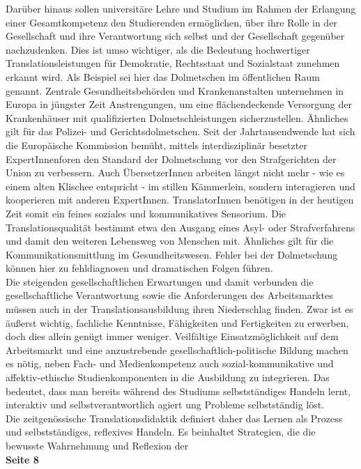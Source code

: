 \documentclass{article}
\begin{document}
	Darüber hinaus sollen universitäre Lehre und Studium im Rahmen der Erlangung einer Gesamtkompetenz den Studierenden ermöglichen, über ihre Rolle in der Gesellschaft und ihre Verantwortung sich selbst und der Gesellschaft gegenüber nachzudenken. Dies ist umso wichtiger, als die Bedeutung hochwertiger Translationsleistungen für Demokratie, Rechtsstaat und Sozialstaat zunehmen erkannt wird. Als Beispiel sei hier das Dolmetschen im öffentlichen Raum genannt. Zentrale Gesundheitsbehörden und Krankenanstalten unternehmen in Europa in jüngster Zeit Anstrengungen, um eine flächendeckende Versorgung der Krankenhäuser mit qualifizierten Dolmetschleistungen sicherzustellen. Ähnliches gilt für das Polizei- und Gerichtsdolmetschen. Seit der Jahrtausendwende hat sich die Europäische Kommission bemüht, mittels interdisziplinär besetzter ExpertInnenforen den Standard der Dolmetschung vor den Strafgerichten der Union zu verbessern. Auch ÜbersetzerInnen arbeiten längst nicht mehr - wie es einem alten Klischee entspricht - im stillen Kämmerlein, sondern interagieren und kooperieren mit anderen ExpertInnen. TranslatorInnen benötigen in der heutigen Zeit somit ein feines soziales und kommunikatives Sensorium. Die Translationsqualität bestimmt etwa den Ausgang eines Asyl- oder Strafverfahrens und damit den weiteren Lebensweg von Menschen mit. Ähnliches gilt für die Kommunikationsmittlung im Gesundheitswesen. Fehler bei der Dolmetschung können hier zu fehldiagnosen und dramatischen Folgen führen. \\
	Die steigenden gesellschaftlichen Erwartungen und damit verbunden die gesellschaftliche Verantwortung sowie die Anforderungen des Arbeitsmarktes müssen auch in der Translationsausbildung ihren Niederschlag finden. Zwar ist es äußerst wichtig, fachliche Kenntnisse, Fähigkeiten und Fertigkeiten zu erwerben, doch dies allein genügt immer weniger. Veilfältige Einsatzmöglichkeit auf dem Arbeitsmarkt und eine anzustrebende gesellschaftlich-politische Bildung machen es nötig, neben Fach- und Medienkompetenz auch sozial-kommunikative und affektiv-ethische Studienkomponenten in die Ausbildung zu integrieren. Das bedeutet, dass man bereits während des Studiums selbstständiges Handeln lernt, interaktiv und selbstverantwortlich agiert ung Probleme selbstständig löst. \\
	Die zeitgenössische Translationsdidaktik definiert daher das Lernen als Prozess und selbstständiges, reflexives Handeln. Es beinhaltet Strategien, die die bewusste Wahrnehmung und Reflexion der \\
	\textbf{Seite 8} \\
\end{document}
